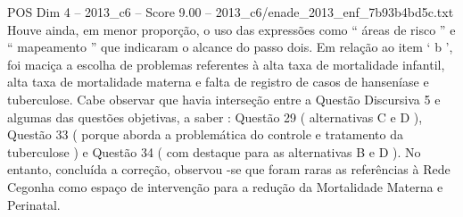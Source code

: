 \begin{textsample}{POS Dim 4 – 2013\_c6 – Score 9.00 – 2013\_c6/enade\_2013\_enf\_7b93b4bd5c.txt}
Houve ainda, em menor proporção, o uso das expressões como “ áreas de risco ” e “ mapeamento ” que indicaram o alcance do passo dois.
Em relação ao item ‘ b ’, foi maciça a escolha de problemas referentes à alta taxa de mortalidade infantil, alta taxa de mortalidade materna e falta de registro de casos de hanseníase e tuberculose.
Cabe observar que havia interseção entre a Questão Discursiva 5 e algumas das questões objetivas, a saber : Questão 29 ( alternativas C e D ), Questão 33 ( porque aborda a problemática do controle e tratamento da tuberculose ) e Questão 34 ( com destaque para as alternativas B e D ).
No entanto, concluída a correção, observou -se que foram raras as referências à Rede Cegonha como espaço de intervenção para a redução da Mortalidade Materna e Perinatal.

\end{textsample}

